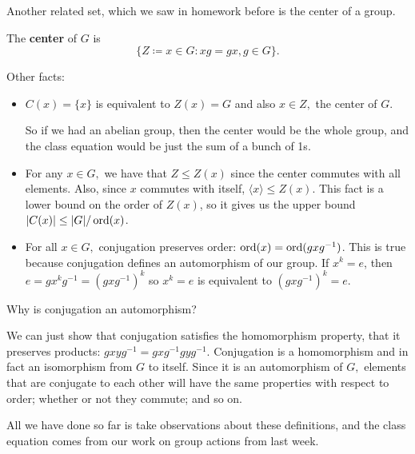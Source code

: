  Another related set, which we saw in homework before is the center of a group. 
 \begin{definition}
 The \textbf{center} of $G$ is 
 \[
 \{Z \coloneqq x \in G: xg = gx, g \in G\}.
 \]
 \end{definition}
 
 Other facts: 
 \begin{itemize}
     \item $C(x) = \{x\}$ is equivalent to $Z(x) = G$ and also $x \in Z,$ the center of $G.$
     
     So if we had an abelian group, then the center would be the whole group, and the class equation would be just the sum of a bunch of 1s.
     \item For any $x \in G,$ we have that $Z \leq Z(x)$ since the center commutes with all elements. Also, since $x$ commutes with itself, $\langle x \rangle \leq Z(x).$ This fact is a lower bound on the order of $Z(x)$, so it gives us the upper bound $|C(x)| \leq |G|/\operatorname{ord}(x)$.
     
     \item For all $x \in G,$ conjugation preserves order: $\operatorname{ord}(x) = \operatorname{ord}(gxg^{-1})$. This is true because conjugation defines an automorphism of our group. If $x^k = e$, then $e = gx^kg^{-1} = (gxg^{-1})^k$ so $x^k = e$ is equivalent to $(gxg^{-1})^k = e.$
 \end{itemize}
 
 
\begin{question}
Why is conjugation an automorphism?
\end{question}
\begin{ans}
We can just show that conjugation satisfies the homomorphism property, that it preserves products: $gxyg^{-1} = gxg^{-1}gyg^{-1}.$
Conjugation is a homomorphism and in fact an isomorphism from $G$ to itself. Since it is an automorphism of $G,$ elements that are conjugate to each other will have the same properties with respect to order; whether or not they commute; and so on. 
\end{ans}

All we have done so far is take observations about these definitions, and the class equation comes from our work on group actions from last week.

